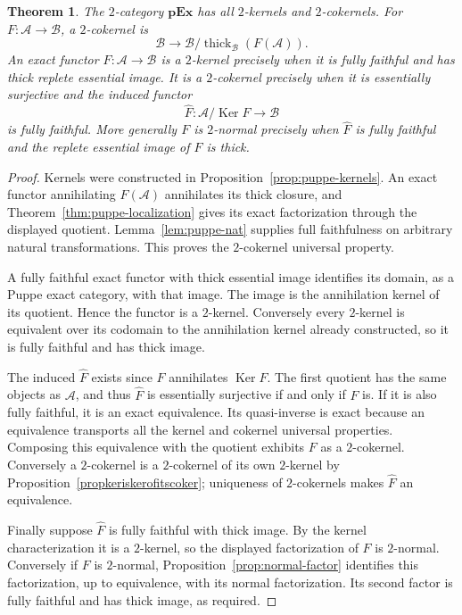 \documentclass[11pt,reqno,a4paper]{amsart}
\newtheorem{theorem}{Theorem}[section]
\theoremstyle{definition}
\theoremstyle{remark}
\newcommand{\A}{\mathcal{A}}
\newcommand{\0}{\mathbf{0}}
\renewcommand{\1}{\mathbf{1}}
\newcommand{\pExact}{\mathbf{pEx}}
\newcommand{\B}{\mathcal B}
\DeclareMathOperator{\Ker}{Ker}
\DeclareMathOperator{\thick}{thick}
\begin{document}
\begin{theorem}\label{thm:puppe-characterization}
The $2$-category $\pExact$ has all $2$-kernels and $2$-cokernels.
For $F:\A\to\B$, a $2$-cokernel is
\[
 \B\longrightarrow\B/\thick_{\B}(F(\A)).
\]
An exact functor $F:\A\to\B$ is a $2$-kernel precisely when it is
fully faithful and has thick replete essential image. It is a
$2$-cokernel precisely when it is essentially surjective and the
induced functor
\[
 \widehat F:\A/\Ker F\longrightarrow\B
\]
is fully faithful. More generally $F$ is $2$-normal precisely when
$\widehat F$ is fully faithful and the replete essential image of
$F$ is thick.
\end{theorem}
\begin{proof}
Kernels were constructed in Proposition~\ref{prop:puppe-kernels}.
An exact functor annihilating $F(\A)$ annihilates its thick closure,
and Theorem~\ref{thm:puppe-localization} gives its exact factorization
through the displayed quotient. Lemma~\ref{lem:puppe-nat} supplies
full faithfulness on arbitrary natural transformations. This proves
the $2$-cokernel universal property.

A fully faithful exact functor with thick essential image identifies
its domain, as a Puppe exact category, with that image. The image is
the annihilation kernel of its quotient. Hence the functor is a
$2$-kernel. Conversely every $2$-kernel is equivalent over its
codomain to the annihilation kernel already constructed, so it is
fully faithful and has thick image.

The induced $\widehat F$ exists since $F$ annihilates $\Ker F$.
The first quotient has the same objects as $\A$, and thus
$\widehat F$ is essentially surjective if and only if $F$ is.
If it is also fully faithful, it is an exact equivalence. Its
quasi-inverse is exact because an equivalence transports all the
kernel and cokernel universal properties. Composing this equivalence
with the quotient exhibits $F$ as a $2$-cokernel. Conversely a
$2$-cokernel is a $2$-cokernel of its own $2$-kernel by
Proposition~\ref{propkeriskerofitscoker}; uniqueness of $2$-cokernels
makes $\widehat F$ an equivalence.

Finally suppose $\widehat F$ is fully faithful with thick image.
By the kernel characterization it is a $2$-kernel, so the displayed
factorization of $F$ is $2$-normal. Conversely if $F$ is $2$-normal,
Proposition~\ref{prop:normal-factor} identifies this factorization,
up to equivalence, with its normal factorization. Its second factor
is fully faithful and has thick image, as required.
\end{proof}
\end{document}
